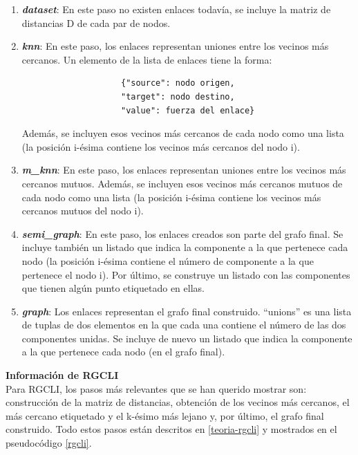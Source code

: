 \begin{enumerate}
    \item \textit{\textbf{dataset}}: En este paso no existen enlaces todavía, se incluye la matriz de distancias D de cada par de nodos.
    \item \textit{\textbf{knn}}: En este paso, los enlaces representan uniones entre los vecinos más cercanos. Un elemento de la lista de enlaces tiene la forma:\\
    \begin{minipage}{\linewidth}
        \begin{center}
            \begin{lstlisting}
                    {"source": nodo origen, 
                    "target": nodo destino, 
                    "value": fuerza del enlace}
            \end{lstlisting}
        \end{center}
    \end{minipage}
    
    Además, se incluyen esos vecinos más cercanos de cada nodo como una lista (la posición i-ésima contiene los vecinos más cercanos del nodo i). 
    \item \textit{\textbf{m\_knn}}: En este paso, los enlaces representan uniones entre los vecinos más cercanos mutuos. Además, se incluyen esos vecinos más cercanos mutuos de cada nodo como una lista (la posición i-ésima contiene los vecinos más cercanos mutuos del nodo i).
     \item \textit{\textbf{semi\_graph}}: En este paso, los enlaces creados son parte del grafo final. Se incluye también un listado que indica la componente a la que pertenece cada nodo (la posición i-ésima contiene el número de componente a la que pertenece el nodo i). Por último, se construye un listado con las componentes que tienen algún punto etiquetado en ellas.
     \item \textit{\textbf{graph}}: Los enlaces representan el grafo final construido. ``unions'' es una lista de tuplas de dos elementos en la que cada una contiene el número de las dos componentes unidas. Se incluye de nuevo un listado que indica la componente a la que pertenece cada nodo (en el grafo final).
\end{enumerate}

\newpage
\noindent\textbf{\large Información de RGCLI} \\
Para RGCLI, los pasos más relevantes que se han querido mostrar son: construcción de la matriz de distancias, obtención de los vecinos más cercanos, el más cercano etiquetado y el k-ésimo más lejano y, por último, el grafo final construido. Todo estos pasos están descritos en \ref{teoria-rgcli} y mostrados en el pseudocódigo \ref{rgcli}.

